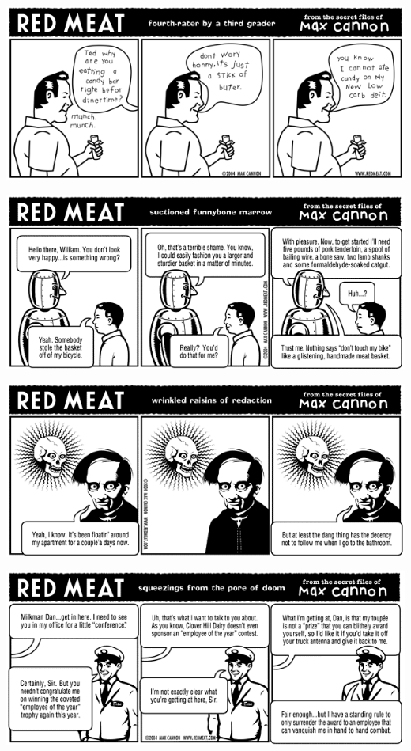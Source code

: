 \documentclass[a4paper,twoside,11pt]{article}
\begin{document}
\includegraphics[width=\textwidth]{redmeat_2004-02-17.png}



\includegraphics[width=\textwidth]{redmeat_2004-02-24.png}



\includegraphics[width=\textwidth]{redmeat_2004-03-02.png}



\includegraphics[width=\textwidth]{redmeat_2004-03-09.png}
\end{document}
